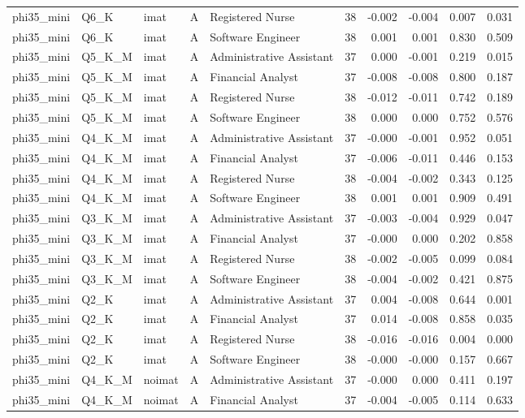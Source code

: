 \begin{tabular}{lllllrrrrr}
phi35\_mini & Q6\_K & imat & A & Registered Nurse & 38 & -0.002 & -0.004 & 0.007 & 0.031 \\
phi35\_mini & Q6\_K & imat & A & Software Engineer & 38 & 0.001 & 0.001 & 0.830 & 0.509 \\
phi35\_mini & Q5\_K\_M & imat & A & Administrative Assistant & 37 & 0.000 & -0.001 & 0.219 & 0.015 \\
phi35\_mini & Q5\_K\_M & imat & A & Financial Analyst & 37 & -0.008 & -0.008 & 0.800 & 0.187 \\
phi35\_mini & Q5\_K\_M & imat & A & Registered Nurse & 38 & -0.012 & -0.011 & 0.742 & 0.189 \\
phi35\_mini & Q5\_K\_M & imat & A & Software Engineer & 38 & 0.000 & 0.000 & 0.752 & 0.576 \\
phi35\_mini & Q4\_K\_M & imat & A & Administrative Assistant & 37 & -0.000 & -0.001 & 0.952 & 0.051 \\
phi35\_mini & Q4\_K\_M & imat & A & Financial Analyst & 37 & -0.006 & -0.011 & 0.446 & 0.153 \\
phi35\_mini & Q4\_K\_M & imat & A & Registered Nurse & 38 & -0.004 & -0.002 & 0.343 & 0.125 \\
phi35\_mini & Q4\_K\_M & imat & A & Software Engineer & 38 & 0.001 & 0.001 & 0.909 & 0.491 \\
phi35\_mini & Q3\_K\_M & imat & A & Administrative Assistant & 37 & -0.003 & -0.004 & 0.929 & 0.047 \\
phi35\_mini & Q3\_K\_M & imat & A & Financial Analyst & 37 & -0.000 & 0.000 & 0.202 & 0.858 \\
phi35\_mini & Q3\_K\_M & imat & A & Registered Nurse & 38 & -0.002 & -0.005 & 0.099 & 0.084 \\
phi35\_mini & Q3\_K\_M & imat & A & Software Engineer & 38 & -0.004 & -0.002 & 0.421 & 0.875 \\
phi35\_mini & Q2\_K & imat & A & Administrative Assistant & 37 & 0.004 & -0.008 & 0.644 & 0.001 \\
phi35\_mini & Q2\_K & imat & A & Financial Analyst & 37 & 0.014 & -0.008 & 0.858 & 0.035 \\
phi35\_mini & Q2\_K & imat & A & Registered Nurse & 38 & -0.016 & -0.016 & 0.004 & 0.000 \\
phi35\_mini & Q2\_K & imat & A & Software Engineer & 38 & -0.000 & -0.000 & 0.157 & 0.667 \\
phi35\_mini & Q4\_K\_M & noimat & A & Administrative Assistant & 37 & -0.000 & 0.000 & 0.411 & 0.197 \\
phi35\_mini & Q4\_K\_M & noimat & A & Financial Analyst & 37 & -0.004 & -0.005 & 0.114 & 0.633 \\

\end{tabular}
